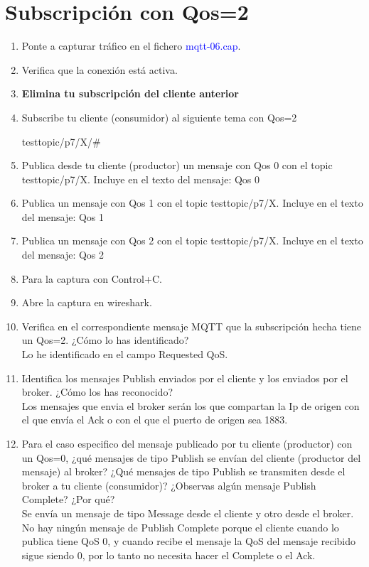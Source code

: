 \documentclass[12pt, a4paper]{report}
\begin{document}
\section{Subscripción con Qos=2}
\begin{enumerate}
	\item Ponte a capturar tráfico en el fichero \textcolor{blue}{mqtt-06.cap}.
	\item Verifica que la conexión está activa.
	\item \textbf{Elimina tu subscripción del cliente anterior}
	\item Subscribe tu cliente (consumidor) al siguiente tema con Qos=2
	\begin{center}
		testtopic/p7/X/\#
	\end{center}
	\item Publica desde tu cliente (productor) un mensaje con Qos 0 con el topic testtopic/p7/X. Incluye
	en el texto del mensaje: Qos 0
	\item Publica un mensaje con Qos 1 con el topic testtopic/p7/X. Incluye en el texto del mensaje:
	Qos 1
	\item Publica un mensaje con Qos 2 con el topic testtopic/p7/X. Incluye en el texto del mensaje:
	Qos 2
	\item Para la captura con Control+C.
	\item Abre la captura en wireshark.
	\item Verifica en el correspondiente mensaje MQTT que la subscripción hecha tiene un Qos=2. ¿Cómo
	lo has identificado?\\
	
	Lo he identificado en el campo Requested QoS.
	\item Identifica los mensajes Publish enviados por el cliente y los enviados por el broker. ¿Cómo los
	has reconocido?\\
	
	Los mensajes que envia el broker serán los que compartan la Ip de origen con el que envía el Ack o con el que el puerto de origen sea 1883.
	
	\item Para el caso especifico del mensaje publicado por tu cliente (productor) con un Qos=0, ¿qué
	mensajes de tipo Publish se envían del cliente (productor del mensaje) al broker? ¿Qué mensajes
	de tipo Publish se transmiten desde el broker a tu cliente (consumidor)? ¿Observas algún mensaje
	Publish Complete? ¿Por qué?\\
	
	Se envía un mensaje de tipo Message desde el cliente y otro desde el broker.\\
	No hay ningún mensaje de Publish Complete porque el cliente cuando lo publica tiene QoS 0, y cuando recibe el mensaje la QoS del mensaje recibido sigue siendo 0, por lo tanto no necesita hacer el Complete o el Ack.


\end{enumerate}
\end{document}
